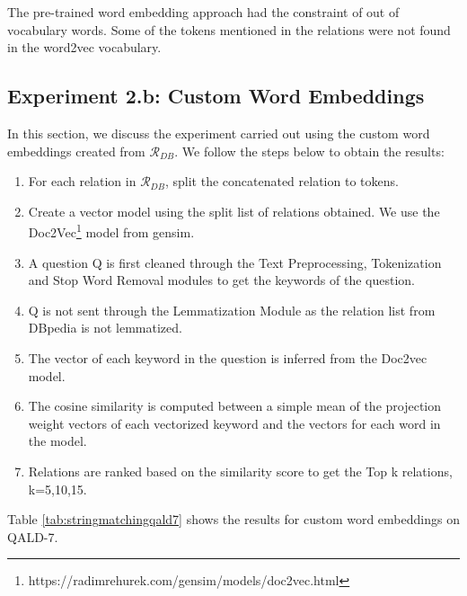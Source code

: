 The pre-trained word embedding approach had the constraint of out of vocabulary words. Some of the tokens mentioned in the relations were not found in the word2vec vocabulary.

\subsection{Experiment 2.b: Custom Word Embeddings}
In this section, we discuss the experiment carried out using the custom word embeddings created from $\mathcal{R}_{DB}$. We follow the steps below to obtain the results:
\begin{enumerate}
\item For each relation in $\mathcal{R}_{DB}$, split the concatenated relation to tokens.
\item Create a vector model using the split list of relations obtained. We use the Doc2Vec\footnote{https://radimrehurek.com/gensim/models/doc2vec.html} model from gensim.
\item A question Q is first cleaned through the Text Preprocessing, Tokenization and Stop Word Removal modules to get the keywords of the question.
\item  Q is not sent through the Lemmatization Module as the relation list from DBpedia is not lemmatized.
\item The vector of each keyword in the question is inferred from the Doc2vec model.
\item The cosine similarity is computed between a simple mean of the projection weight vectors of each vectorized keyword and the vectors for each word in the model.
\item Relations are ranked based on the similarity score to get the Top k relations, k=5,10,15.
\end{enumerate}
Table \ref{tab:stringmatchingqald7} shows the results for custom word embeddings on QALD-7.

